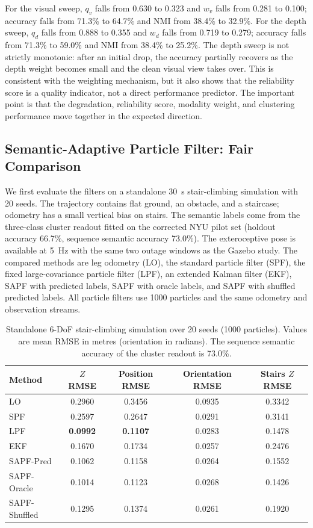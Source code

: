 \documentclass[final,3p,times]{elsarticle}
\begin{document}
For the visual sweep, $q_v$ falls from 0.630 to 0.323 and $w_v$ falls from 0.281 to 0.100; accuracy falls from 71.3\% to 64.7\% and NMI from 38.4\% to 32.9\%. For the depth sweep, $q_d$ falls from 0.888 to 0.355 and $w_d$ falls from 0.719 to 0.279; accuracy falls from 71.3\% to 59.0\% and NMI from 38.4\% to 25.2\%. The depth sweep is not strictly monotonic: after an initial drop, the accuracy partially recovers as the depth weight becomes small and the clean visual view takes over. This is consistent with the weighting mechanism, but it also shows that the reliability score is a quality indicator, not a direct performance predictor. The important point is that the degradation, reliability score, modality weight, and clustering performance move together in the expected direction.

\subsection{Semantic-Adaptive Particle Filter: Fair Comparison}
\label{subsec:sapf_exp}
We first evaluate the filters on a standalone 30~s stair-climbing simulation with 20 seeds. The trajectory contains flat ground, an obstacle, and a staircase; odometry has a small vertical bias on stairs. The semantic labels come from the three-class cluster readout fitted on the corrected NYU pilot set (holdout accuracy 66.7\%, sequence semantic accuracy 73.0\%). The exteroceptive pose is available at 5~Hz with the same two outage windows as the Gazebo study. The compared methods are leg odometry (LO), the standard particle filter (SPF), the fixed large-covariance particle filter (LPF), an extended Kalman filter (EKF), SAPF with predicted labels, SAPF with oracle labels, and SAPF with shuffled predicted labels. All particle filters use 1000 particles and the same odometry and observation streams.

\begin{table}[t]
    \centering
    \caption{Standalone 6-DoF stair-climbing simulation over 20 seeds (1000 particles). Values are mean RMSE in metres (orientation in radians). The sequence semantic accuracy of the cluster readout is 73.0\%.}
    \label{tab:standalone_sapf}
    \begin{tabular}{lcccc}
        \toprule
        \textbf{Method} & \textbf{$Z$ RMSE} & \textbf{Position RMSE} & \textbf{Orientation RMSE} & \textbf{Stairs $Z$ RMSE} \\
        \midrule
        LO & 0.2960 & 0.3456 & 0.0935 & 0.3342 \\
        SPF & 0.2597 & 0.2647 & 0.0291 & 0.3141 \\
        LPF & \textbf{0.0992} & \textbf{0.1107} & 0.0283 & 0.1478 \\
        EKF & 0.1670 & 0.1734 & 0.0257 & 0.2476 \\
        SAPF-Pred & 0.1062 & 0.1158 & 0.0264 & 0.1552 \\
        SAPF-Oracle & 0.1014 & 0.1123 & 0.0268 & 0.1426 \\
        SAPF-Shuffled & 0.1295 & 0.1374 & 0.0261 & 0.1920 \\
        \bottomrule
    \end{tabular}
\end{table}
\end{document}
